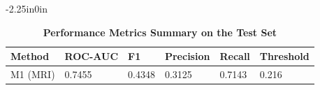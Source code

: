 \documentclass[10pt,letterpaper]{article}
\begin{document}
                                                                                                                          \begin{table}[!t]
                                                                                                                          \begin{adjustwidth}{-2.25in}{0in}
                                                                                                                          \centering
                                                                                                                          \caption{\textbf{Performance Metrics Summary on the Test Set}}
                                                                                                                          \label{tab:performance_summary}
                                                                                                                          \footnotesize
                                                                                                                          \renewcommand{\arraystretch}{1.15}

                                                                                                                          \begin{tabular}{|p{3.0cm}|p{2.0cm}|p{2.0cm}|p{2.0cm}|p{2.0cm}|p{2.0cm}|}
                                                                                                                          \hline
                                                                                                                          \textbf{Method} & \textbf{ROC-AUC} & \textbf{F1} & \textbf{Precision} & \textbf{Recall} & \textbf{Threshold} \\
                                                                                                                          \hline

                                                                                                                          M1 (MRI)
                                                                                                                          & 0.7455
                                                                                                                          & 0.4348
                                                                                                                          & 0.3125
                                                                                                                          & 0.7143
                                                                                                                          & 0.216 \\
                                                                                                                          \hline


\end{tabular}
\end{adjustwidth}
\end{table}
\end{document}
